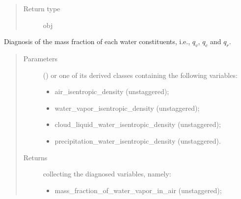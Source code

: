 \documentclass[letterpaper,10pt,english]{sphinxmanual}
\begin{document}
\begin{fulllineitems}
\begin{fulllineitems}
\begin{quote}
\begin{description}
\begin{itemize}
\end{itemize}


\item[{Return type}] \leavevmode
obj

\end{description}\end{quote}

\end{fulllineitems}


\begin{fulllineitems}
\label{\detokenize{api:tasmania.dycore.diagnostic_isentropic.DiagnosticIsentropic.get_mass_fraction_of_water_constituents_in_air}}
Diagnosis of the mass fraction of each water constituents, i.e., \(q_v\), \(q_c\) and \(q_r\).
\begin{quote}\begin{description}
\item[{Parameters}] \leavevmode
{} () \textendash{} 
{\hyperref[\detokenize{api:tasmania.storages.grid_data.GridData}]{}} or one of its derived classes containing the following variables:
\begin{itemize}
\item {} 
air\_isentropic\_density (unstaggered);

\item {} 
water\_vapor\_isentropic\_density (unstaggered);

\item {} 
cloud\_liquid\_water\_isentropic\_density (unstaggered);

\item {} 
precipitation\_water\_isentropic\_density (unstaggered).

\end{itemize}


\item[{Returns}] \leavevmode

{\hyperref[\detokenize{api:tasmania.storages.grid_data.GridData}]{}} collecting the diagnosed variables, namely:
\begin{itemize}
\item {} 
mass\_fraction\_of\_water\_vapor\_in\_air (unstaggered);


\end{itemize}
\end{description}
\end{quote}
\end{fulllineitems}
\end{fulllineitems}
\end{document}
